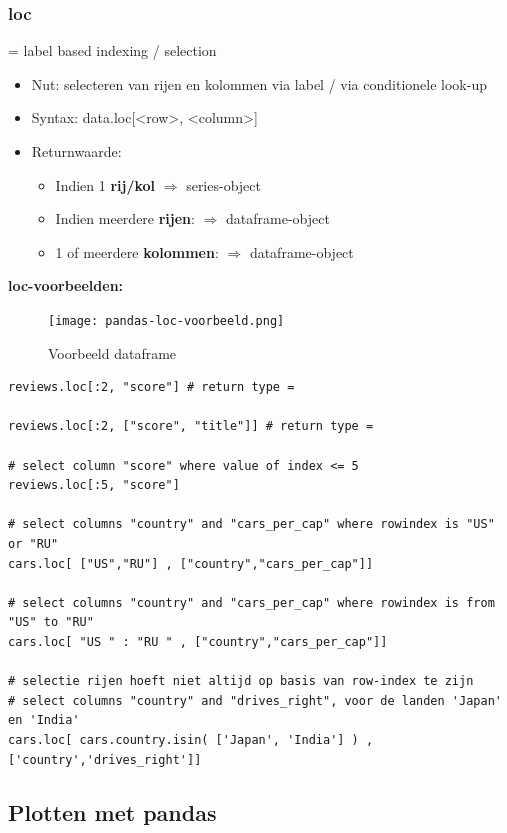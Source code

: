 \documentclass{article}
\begin{document}
\subsubsection{loc}

= label based indexing / selection

\begin{itemize}
    \item Nut: selecteren van rijen en kolommen via label / via conditionele look-up
    \item Syntax: data.loc[<row>, <column>]
    \item Returnwaarde:
    \begin{itemize}
        \item Indien 1 \textbf{rij/kol} $\Rightarrow$ series-object
        \item Indien meerdere \textbf{rijen}: $\Rightarrow$ dataframe-object
        \item 1 of meerdere \textbf{kolommen}: $\Rightarrow$ dataframe-object 
    \end{itemize}
\end{itemize}


\textbf{loc-voorbeelden:}

\begin{figure}[H]
    \centering
    \texttt{[image: pandas-loc-voorbeeld.png]}
    \caption{Voorbeeld dataframe}
\end{figure}


\begin{verbatim}
reviews.loc[:2, "score"] # return type = 

reviews.loc[:2, ["score", "title"]] # return type = 

# select column "score" where value of index <= 5
reviews.loc[:5, "score"]

# select columns "country" and "cars_per_cap" where rowindex is "US" or "RU"
cars.loc[ ["US","RU"] , ["country","cars_per_cap"]]

# select columns "country" and "cars_per_cap" where rowindex is from "US" to "RU"
cars.loc[ "US " : "RU " , ["country","cars_per_cap"]]

# selectie rijen hoeft niet altijd op basis van row-index te zijn
# select columns "country" and "drives_right", voor de landen 'Japan' en 'India'
cars.loc[ cars.country.isin( ['Japan', 'India'] ) , ['country','drives_right']]
\end{verbatim}

\subsection{Plotten met pandas}
\end{document}
